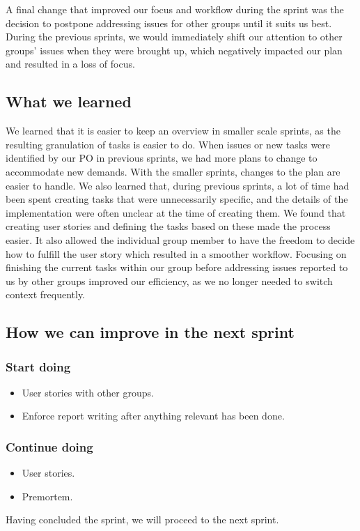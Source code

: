A final change that improved our focus and workflow during the sprint was the decision to postpone addressing issues for other groups until it suits us best. During the previous sprints, we would immediately shift our attention to other groups' issues when they were brought up, which negatively impacted our plan and resulted in a loss of focus.

\subsection{What we learned}
We learned that it is easier to keep an overview in smaller scale sprints, as the resulting granulation of tasks is easier to do. When issues or new tasks were identified by our PO in previous sprints, we had more plans to change to accommodate new demands. With the smaller sprints, changes to the plan are easier to handle. 
We also learned that, during previous sprints, a lot of time had been spent creating tasks that were unnecessarily specific, and the details of the implementation were often unclear at the time of creating them. We found that creating user stories and defining the tasks based on these made the process easier. It also allowed the individual group member to have the freedom to decide how to fulfill the user story which resulted in a smoother workflow.  
Focusing on finishing the current tasks within our group before addressing issues reported to us by other groups improved our efficiency, as we no longer needed to switch context frequently.

\subsection{How we can improve in the next sprint}
\subsubsection{Start doing}
\begin{itemize}
    \item User stories with other groups.
    \item Enforce report writing after anything relevant has been done.
\end{itemize}
\subsubsection{Continue doing}
\begin{itemize}
    \item User stories.
    \item Premortem.
\end{itemize}

Having concluded the sprint, we will proceed to the next sprint.
